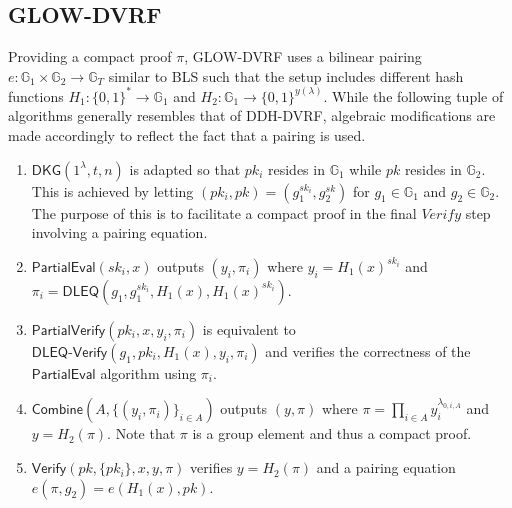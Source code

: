 \documentclass[letterpaper,twocolumn,10pt]{article}
\theoremstyle{definition}
\theoremstyle{remark}
\begin{document}
\subsection{GLOW-DVRF}
\label{appendix:glow-dvrf}
Providing a compact proof $\pi$, GLOW-DVRF uses a bilinear pairing $e: \mathbb{G}_1 \times \mathbb{G}_2 \rightarrow \mathbb{G}_T$ similar to BLS such that the setup includes different hash functions $H_1: \{0, 1\}^* \rightarrow \mathbb{G}_1$ and $H_2: \mathbb{G}_1 \rightarrow \{0, 1\}^{y(\lambda)}$. While the following tuple of algorithms generally resembles that of DDH-DVRF, algebraic modifications are made accordingly to reflect the fact that a pairing is used.
\begin{enumerate}
\item $\mathsf{DKG}(1^\lambda, t, n)$ is adapted so that $pk_i$ resides in $\mathbb{G}_1$ while $pk$ resides in $\mathbb{G}_2$. This is achieved by letting $(pk_i, pk) = (g_1^{sk_i}, g_2^{sk})$ for $g_1 \in \mathbb{G}_1$ and $g_2 \in \mathbb{G}_2$. The purpose of this is to facilitate a compact proof in the final $Verify$ step involving a pairing equation.
\item $\mathsf{PartialEval}(sk_i, x)$ outputs $(y_i, \pi_i)$ where $y_i = H_1(x)^{sk_i}$ and $\pi_i = \mathsf{DLEQ}(g_1, g_1^{sk_i}, H_1(x), H_1(x)^{sk_i})$.
\item $\mathsf{PartialVerify}(pk_i, x, y_i, \pi_i)$ is equivalent to $\mathsf{DLEQ}\text{-}\mathsf{Verify}(g_1, pk_i, H_1(x), y_i, \pi_i)$ and verifies the correctness of the $\mathsf{PartialEval}$ algorithm using $\pi_i$.
\item $\mathsf{Combine}(A, \{(y_i, \pi_i)\}_{i \in A})$ outputs $(y, \pi)$ where $\pi = \prod_{i \in A} y_i^{\lambda_{0, i, A}}$ and $y = H_2(\pi)$. Note that $\pi$ is a group element and thus a compact proof.
\item $\mathsf{Verify}(pk, \{pk_i\}, x, y, \pi)$ verifies $y = H_2(\pi)$ and a pairing equation $e(\pi, g_2) = e(H_1(x), pk)$.
\end{enumerate}
\end{document}
